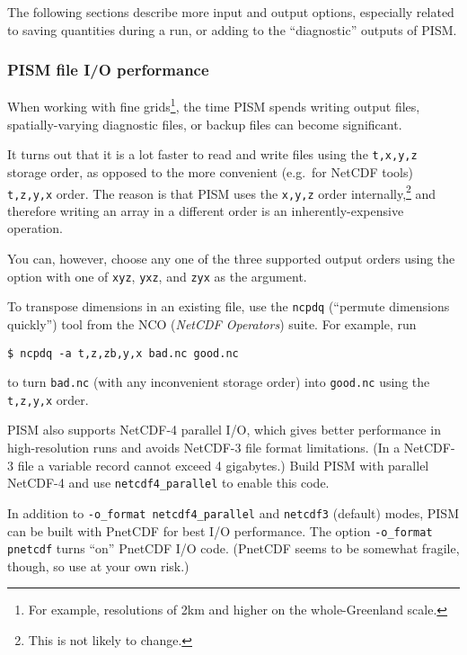 The following sections describe more input and output options, especially related to saving quantities during a run, or adding to the ``diagnostic'' outputs of PISM.

\clearpage

\subsubsection{PISM file I/O performance}
\label{sec:pism-io-performance}

When working with fine grids\footnote{For example, resolutions of 2km and higher on the whole-Greenland scale.}, the time PISM spends writing output files, spatially-varying diagnostic files, or backup files can become significant.

It turns out that it is a lot faster to read and write files using the \texttt{t,x,y,z} storage order, as opposed to the more convenient (e.g.~for NetCDF tools) \texttt{t,z,y,x} order.  The reason is that PISM uses the \texttt{x,y,z} order internally,\footnote{This is not likely to change.} and therefore writing an array in a different order is an inherently-expensive operation.

You can, however, choose any one of the three supported output orders using the  option with one of \texttt{xyz}, \texttt{yxz}, and \texttt{zyx} as the argument.

To transpose dimensions in an existing file, use the \texttt{ncpdq} (``permute dimensions quickly'') tool from the NCO (\emph{NetCDF Operators}) suite.  For example, run
\begin{verbatim}
$ ncpdq -a t,z,zb,y,x bad.nc good.nc
\end{verbatim}
to turn \texttt{bad.nc} (with any inconvenient storage order) into \texttt{good.nc} using the \texttt{t,z,y,x} order.

PISM also supports NetCDF-4 parallel I/O, which gives better performance in
high-resolution runs and avoids NetCDF-3 file format limitations. (In a
NetCDF-3 file a variable record cannot exceed 4 gigabytes.) Build PISM with
parallel NetCDF-4 and use  \texttt{netcdf4_parallel} to
enable this code.

In addition to \texttt{-o_format netcdf4_parallel} and \texttt{netcdf3}
(default) modes, PISM can be built with PnetCDF for best I/O performance. The
option \texttt{-o_format pnetcdf} turns ``on'' PnetCDF I/O code. (PnetCDF seems
to be somewhat fragile, though, so use at your own risk.)


